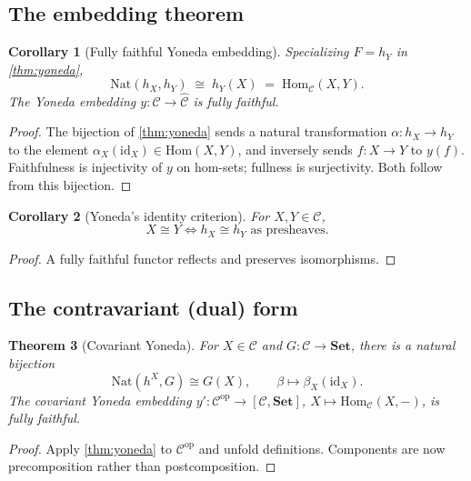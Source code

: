 \documentclass[12pt]{article}
\newtheorem{theorem}{Theorem}[section]
\newtheorem{corollary}[theorem]{Corollary}
\theoremstyle{definition}
\theoremstyle{remark}
\begin{document}
\subsection{The embedding theorem}

\begin{corollary}[Fully faithful Yoneda embedding]
\label{cor:yoneda-fully-faithful}
Specializing $F = h_Y$ in \cref{thm:yoneda},
\[
\mathrm{Nat}(h_X, h_Y) \;\cong\; h_Y(X) \;=\; \mathrm{Hom}_{\mathcal{C}}(X, Y).
\]
The Yoneda embedding $y\colon \mathcal{C} \to \widehat{\mathcal{C}}$ is fully faithful.
\end{corollary}

\begin{proof}
The bijection of \cref{thm:yoneda} sends a natural transformation $\alpha\colon h_X \to h_Y$ to the element $\alpha_X(\mathrm{id}_X) \in \mathrm{Hom}(X, Y)$, and inversely sends $f\colon X \to Y$ to $y(f)$. Faithfulness is injectivity of $y$ on hom-sets; fullness is surjectivity. Both follow from this bijection.
\end{proof}

\begin{corollary}[Yoneda's identity criterion]
\label{cor:identity-criterion}
For $X, Y \in \mathcal{C}$,
\[
X \cong Y \iff h_X \cong h_Y \text{ as presheaves.}
\]
\end{corollary}

\begin{proof}
A fully faithful functor reflects and preserves isomorphisms.
\end{proof}

\subsection{The contravariant (dual) form}

\begin{theorem}[Covariant Yoneda]
\label{thm:co-yoneda}
For $X \in \mathcal{C}$ and $G\colon \mathcal{C} \to \mathbf{Set}$, there is a natural bijection
\[
\mathrm{Nat}(h^X, G) \cong G(X), \qquad \beta \longmapsto \beta_X(\mathrm{id}_X).
\]
The covariant Yoneda embedding $y'\colon \mathcal{C}^{\mathrm{op}} \to [\mathcal{C}, \mathbf{Set}]$, $X \mapsto \mathrm{Hom}_{\mathcal{C}}(X, -)$, is fully faithful.
\end{theorem}

\begin{proof}
Apply \cref{thm:yoneda} to $\mathcal{C}^{\mathrm{op}}$ and unfold definitions. Components are now precomposition rather than postcomposition.
\end{proof}
\end{document}
